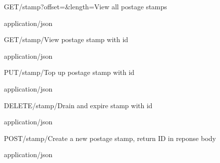 
\begin{apiRoute}{GET}{/stamp?offset=\&length=}{View all postage stamps}
{
}
{ }
\begin{queryParameter} 
\end{queryParameter}

\begin{routeResponse}{application/json}
\end{routeResponse}
\end{apiRoute}



\begin{apiRoute}{GET}{/stamp/}{View postage stamp with id}
{
}
{ }

\begin{routeParameter} 
\end{routeParameter}
\begin{routeResponse}{application/json}
\end{routeResponse}
\end{apiRoute}




\begin{apiRoute}{PUT}{/stamp/}{Top up postage stamp with id}
{
}
{ }

\begin{routeParameter} 
\end{routeParameter}
\begin{queryParameter} 
\end{queryParameter}

\begin{routeResponse}{application/json}
\end{routeResponse}
\end{apiRoute}



\begin{apiRoute}{DELETE}{/stamp/}{Drain and expire stamp with id}
{
}
{ }

\begin{routeParameter} 
\end{routeParameter}
\begin{routeResponse}{application/json}
\end{routeResponse}
\end{apiRoute}


\begin{apiRoute}{POST}{/stamp/}{Create a new postage stamp, return ID in reponse body}
{
}
{ }

\begin{routeParameter} 
\end{routeParameter}
\begin{routeResponse}{application/json}
\end{routeResponse}
\end{apiRoute}
